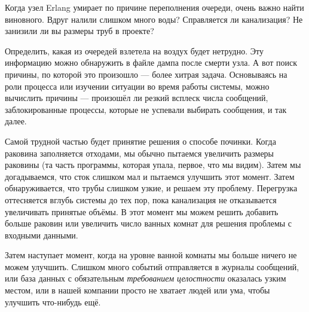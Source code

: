 Когда узел Erlang умирает по причине переполнения очереди, очень важно найти виновного. Вдруг налили слишком много воды? Справляется ли канализация? Не занизили ли вы размеры труб в проекте?

Определить, какая из очередей взлетела на воздух будет нетрудно. Эту информацию можно обнаружить в файле дампа после смерти узла. А вот поиск причины, по которой это произошло --- более хитрая задача. Основываясь на роли процесса или изучении ситуации во время работы системы, можно вычислить причины --- произошёл ли резкий всплеск числа сообщений, заблокированные процессы, которые не успевали выбирать сообщения, и так далее.

Самой трудной частью будет принятие решения о способе починки. Когда раковина заполняется отходами, мы обычно пытаемся увеличить размеры раковины (та часть программы, которая упала, первое, что мы видим). Затем мы догадываемся, что сток слишком мал и пытаемся улучшить этот момент. Затем обнаруживается, что трубы слишком узкие, и решаем эту проблему. Перегрузка оттесняется вглубь системы до тех пор, пока канализация не отказывается увеличивать принятые объёмы. В этот момент мы можем решить добавить больше раковин или увеличить число ванных комнат для решения проблемы с входными данными.

Затем наступает момент, когда на уровне ванной комнаты мы больше ничего не можем улучшить. Слишком много событий отправляется в журналы сообщений, или база данных с обязательным \emph{требованием целостности} оказалась узким местом, или в нашей компании просто не хватает людей или ума, чтобы улучшить что-нибудь ещё.


